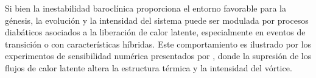 

Si bien la inestabilidad baroclínica proporciona el entorno favorable para la génesis, la evolución y la intensidad del sistema puede ser modulada por procesos diabáticos asociados a la liberación de calor latente, especialmente en eventos de transición o con características híbridas. Este comportamiento es ilustrado por los experimentos de sensibilidad numérica presentados por \citet{reboita2022from}, donde la supresión de los flujos de calor latente altera la estructura térmica y la intensidad del vórtice.


